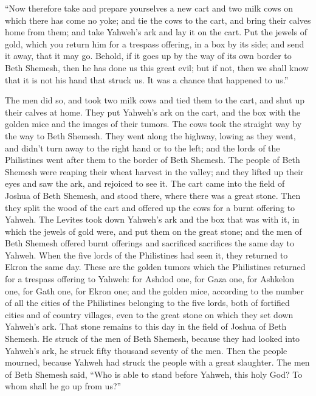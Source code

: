  ``Now therefore take and prepare yourselves a new cart and
two milk cows on which there has come no yoke; and tie the cows to the
cart, and bring their calves home from them;  and take
Yahweh's ark and lay it on the cart. Put the jewels of gold, which you
return him for a trespass offering, in a box by its side; and send it
away, that it may go.  Behold, if it goes up by the way of
its own border to Beth Shemesh, then he has done us this great evil; but
if not, then we shall know that it is not his hand that struck us. It
was a chance that happened to us.''

 The men did so, and took two milk cows and tied them to
the cart, and shut up their calves at home.  They put
Yahweh's ark on the cart, and the box with the golden mice and the
images of their tumors.  The cows took the straight way by
the way to Beth Shemesh. They went along the highway, lowing as they
went, and didn't turn away to the right hand or to the left; and the
lords of the Philistines went after them to the border of Beth Shemesh.
 The people of Beth Shemesh were reaping their wheat
harvest in the valley; and they lifted up their eyes and saw the ark,
and rejoiced to see it.  The cart came into the field of
Joshua of Beth Shemesh, and stood there, where there was a great stone.
Then they split the wood of the cart and offered up the cows for a burnt
offering to Yahweh.  The Levites took down Yahweh's ark and
the box that was with it, in which the jewels of gold were, and put them
on the great stone; and the men of Beth Shemesh offered burnt offerings
and sacrificed sacrifices the same day to Yahweh.  When the
five lords of the Philistines had seen it, they returned to Ekron the
same day.  These are the golden tumors which the
Philistines returned for a trespass offering to Yahweh: for Ashdod one,
for Gaza one, for Ashkelon one, for Gath one, for Ekron one;
 and the golden mice, according to the number of all the
cities of the Philistines belonging to the five lords, both of fortified
cities and of country villages, even to the great stone on which they
set down Yahweh's ark. That stone remains to this day in the field of
Joshua of Beth Shemesh.  He struck of the men of Beth
Shemesh, because they had looked into Yahweh's ark, he struck fifty
thousand seventy of the men. Then the people mourned, because Yahweh had
struck the people with a great slaughter.  The men of Beth
Shemesh said, ``Who is able to stand before Yahweh, this holy God? To
whom shall he go up from us?''

